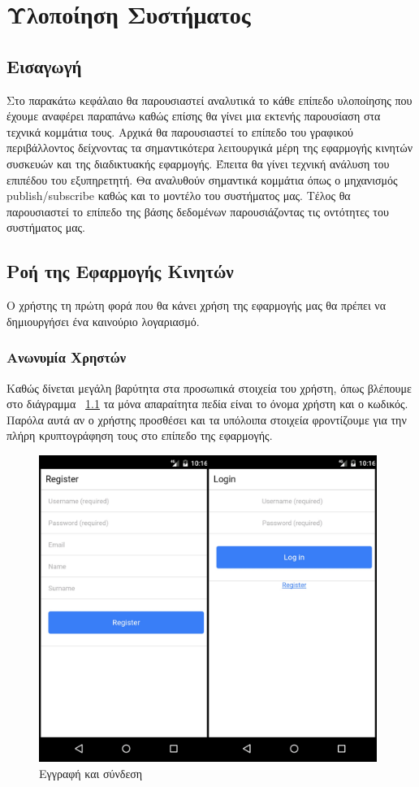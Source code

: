 \chapter{Υλοποίηση Συστήματος}

\section{Εισαγωγή}
Στο παρακάτω κεφάλαιο θα παρουσιαστεί αναλυτικά το κάθε επίπεδο υλοποίησης που έχουμε αναφέρει παραπάνω καθώς επίσης θα γίνει μια εκτενής παρουσίαση στα τεχνικά κομμάτια τους. Αρχικά θα παρουσιαστεί το επίπεδο του γραφικού περιβάλλοντος δείχνοντας τα σημαντικότερα λειτουργικά μέρη της εφαρμογής κινητών συσκευών και της διαδικτυακής εφαρμογής. Έπειτα θα γίνει τεχνική ανάλυση του επιπέδου του εξυπηρετητή. Θα αναλυθούν σημαντικά κομμάτια όπως ο μηχανισμός publish/subscribe καθώς και το μοντέλο του συστήματος μας. Τέλος θα παρουσιαστεί το επίπεδο της βάσης δεδομένων παρουσιάζοντας τις οντότητες του συστήματος μας.

\section{Ροή της Εφαρμογής Κινητών}
Ο χρήστης τη πρώτη φορά που θα κάνει χρήση της εφαρμογής μας θα πρέπει να δημιουργήσει ένα καινούριο λογαριασμό. 

\subsection{Ανωνυμία Χρηστών}
Καθώς δίνεται μεγάλη βαρύτητα στα προσωπικά στοιχεία του χρήστη, όπως βλέπουμε στο διάγραμμα ~\ref{fig:login-register} τα μόνα απαραίτητα πεδία είναι το όνομα χρήστη και ο κωδικός. Παρόλα αυτά αν ο χρήστης προσθέσει και τα υπόλοιπα στοιχεία φροντίζουμε για την πλήρη κρυπτογράφηση τους στο επίπεδο της εφαρμογής. 

\begin{figure}[h]
  \centering
  \includegraphics[width=110mm]{images/login-register.jpg}
  \caption{Εγγραφή και σύνδεση}
  \label{fig:login-register}
\end{figure}

